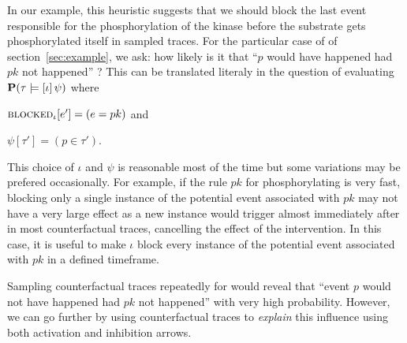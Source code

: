In our example, this heuristic suggests that we should block the last
event responsible for the phosphorylation of the kinase before the
substrate gets phosphorylated itself in sampled traces. For the
particular case of \RefTrace{} of
section~\ref{sec:example}, we ask: how likely is it that ``$p$ would
have happened had $pk$ not happened'' ?  This can be translated
literaly in the question of evaluating $\mathbf{P}(\tau \models [\iota] \, \psi{})$ where
\begin{inparaenum}[(i)]
\item ${\textsc{blocked}}_{\iota}[e'] = (e = pk)$ and
\item $\psi[\tau'] = (p \in \tau')$.
\end{inparaenum}
This choice of $\iota$ and $\psi$ is reasonable most of the
time but some variations may be prefered occasionally. For example, if
the rule $pk$ for phosphorylating is very fast, blocking only a single
instance of the potential event associated with $pk$ may not have a
very large effect as a new instance would trigger almost immediately
after in most counterfactual traces, cancelling the effect of the
intervention.  In this case, it is useful to make $\iota$ block every
instance of the potential event associated with $pk$ in a defined
timeframe.

Sampling counterfactual traces repeatedly for
\RefTrace{} would reveal that ``event $p$ would not
have happened had $pk$ not happened'' with very high probability.
However, we can go further by using counterfactual traces to
\textit{explain} this influence using both activation and inhibition
arrows.